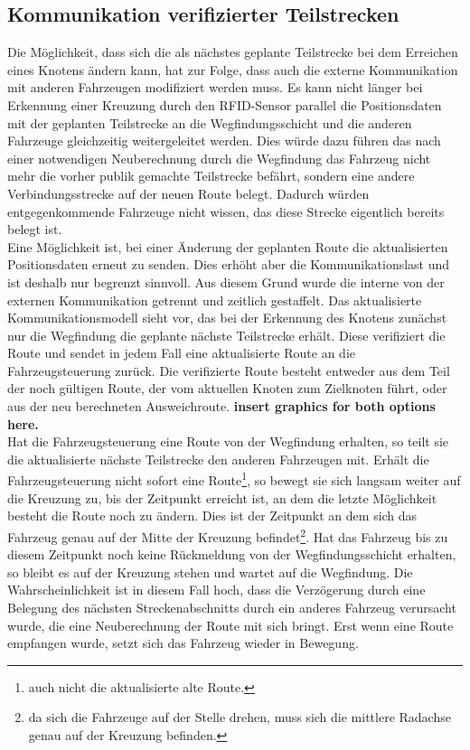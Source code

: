 	\subsection{Kommunikation verifizierter Teilstrecken}
		\label{Anpassung Kommunikation}
		Die Möglichkeit, dass sich die als nächstes geplante Teilstrecke bei dem Erreichen eines Knotens ändern kann, hat zur Folge, dass auch die externe Kommunikation mit anderen Fahrzeugen modifiziert werden muss. Es kann nicht länger bei Erkennung einer Kreuzung durch den \ac{RFID}-Sensor parallel die Positionsdaten mit der geplanten Teilstrecke an die Wegfindungsschicht und die anderen Fahrzeuge gleichzeitig weitergeleitet werden. Dies würde dazu führen das nach einer notwendigen Neuberechnung durch die Wegfindung das Fahrzeug nicht mehr die vorher publik gemachte Teilstrecke befährt, sondern eine andere Verbindungsstrecke auf der neuen Route belegt. Dadurch würden entgegenkommende Fahrzeuge nicht wissen, das diese Strecke eigentlich bereits belegt ist.
		\\[4pt]
		Eine Möglichkeit ist, bei einer Änderung der geplanten Route die aktualisierten Positionsdaten erneut zu senden. Dies erhöht aber die Kommunikationslast und ist deshalb nur begrenzt sinnvoll. Aus diesem Grund  wurde die interne von der externen Kommunikation getrennt und zeitlich gestaffelt. Das aktualisierte Kommunikationsmodell sieht vor, das bei der Erkennung des Knotens zunächst nur die Wegfindung die geplante nächste Teilstrecke erhält. Diese verifiziert die Route und sendet in jedem Fall eine aktualisierte Route an die Fahrzeugsteuerung zurück. Die verifizierte Route besteht entweder aus dem Teil der noch gültigen Route, der vom aktuellen Knoten zum Zielknoten führt, oder aus der neu berechneten Ausweichroute. \textbf{insert graphics for both options here.}
		\\[4pt]
		Hat die Fahrzeugsteuerung eine Route von der Wegfindung erhalten, so teilt sie die aktualisierte nächste Teilstrecke den anderen Fahrzeugen mit. Erhält die Fahrzeugsteuerung nicht sofort eine Route\footnote{auch nicht die aktualisierte alte Route.}, so bewegt sie sich langsam weiter auf die Kreuzung zu, bis der Zeitpunkt erreicht ist, an dem die letzte Möglichkeit besteht die Route noch zu ändern. Dies ist der Zeitpunkt an dem sich das Fahrzeug genau auf der Mitte der Kreuzung befindet\footnote{da sich die Fahrzeuge auf der Stelle drehen, muss sich die mittlere Radachse genau auf der Kreuzung befinden.}. Hat das Fahrzeug bis zu diesem Zeitpunkt noch keine Rückmeldung von der Wegfindungsschicht erhalten, so bleibt es auf der Kreuzung stehen und wartet auf die Wegfindung. Die Wahrscheinlichkeit ist in diesem Fall hoch, dass die Verzögerung durch eine Belegung des nächsten Streckenabschnitts durch ein anderes Fahrzeug verursacht wurde, die eine Neuberechnung der Route mit sich bringt. Erst wenn eine Route empfangen wurde, setzt sich das Fahrzeug wieder in Bewegung.
		
